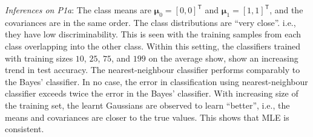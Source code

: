 \documentclass[11pt, a4 paper]{article}
\newcommand{\TT}{\mathsf{T}}
\newcommand{\bmu}{\boldsymbol{\mu}}
\begin{document}
{\it Inferences on P1a}: The class means are $\bmu_{0} = [0,0]^{\TT}$ and $\bmu_{1} = [1,1]^{\TT}$, and the covariances are in the same order. The class distributions are ``very close''. i.e., they have low discriminability. This is seen with the training samples from each class overlapping into the other class. Within this setting, the classifiers trained with training sizes $10$, $25$, $75$, and $199$ on the average show, show an increasing trend in test accuracy. The nearest-neighbour classifier performs comparably to the Bayes' classifier. In no case, the error in classification using nearest-neighbour classifier exceeds twice the error in the Bayes' classifier. With increasing size of the training set, the learnt Gaussians are observed to learn ``better'', i.e., the means and covariances are closer to the true values. This shows that MLE is consistent.
\end{document}
